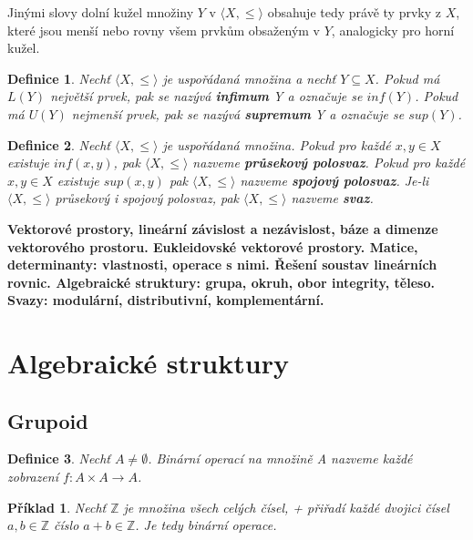 \documentclass[12pt,a4paper]{article}
\newtheorem{definition}{Definice}
\newtheorem{example}{Příklad}
\begin{document}
Jinými slovy dolní kužel množiny $Y$ v  $\langle X, \leq \rangle$ obsahuje tedy právě ty prvky z $X$, které jsou menší nebo rovny všem prvkům obsaženým v $Y$, analogicky pro horní kužel.

\begin{definition}
	Nechť  $\langle X, \leq \rangle$ je uspořádaná množina a nechť $Y \subseteq X$. Pokud má $L(Y)$ největší prvek, pak se nazývá \textbf{infimum} Y a označuje se $inf(Y)$. Pokud má $U(Y)$ nejmenší prvek, pak se nazývá \textbf{supremum} Y a označuje se $sup(Y)$.
\end{definition}

\begin{definition}
	Nechť  $\langle X, \leq \rangle$ je uspořádaná množina. Pokud pro každé $x,y \in X$ existuje $inf(x,y)$, pak  $\langle X, \leq \rangle$ nazveme \textbf{průsekový polosvaz}. Pokud pro každé $x,y \in X$ existuje $sup(x,y)$ pak  $\langle X, \leq \rangle$ nazveme \textbf{spojový polosvaz}. Je-li  $\langle X, \leq \rangle$ průsekový i spojový polosvaz, pak  $\langle X, \leq \rangle$ nazveme \textbf{svaz}.
\end{definition}

\newpage
\textbf{Vektorové prostory, lineární závislost a nezávislost, báze a dimenze vektorového prostoru. Eukleidovské vektorové
prostory. Matice, determinanty: vlastnosti, operace s nimi. Řešení soustav lineárních rovnic. Algebraické
struktury: grupa, okruh, obor integrity, těleso. Svazy: modulární, distributivní, komplementární.}

\section{Algebraické struktury}
\subsection{Grupoid}
\begin{definition}
	Nechť $A \not= \emptyset$. Binární operací na množině A nazveme každé zobrazení $f : A \times A \rightarrow A$.
\end{definition}

\begin{example}
	Nechť $\mathbb{Z}$ je množina všech celých čísel, + přiřadí každé dvojici čísel $a,b \in \mathbb{Z}$ číslo $a + b \in \mathbb{Z}$. Je tedy binární operace.
\end{example}
\end{document}

